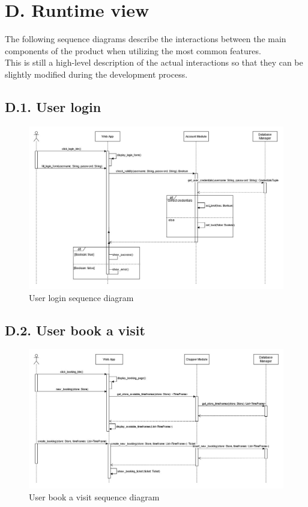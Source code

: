 \section{D. Runtime view}

The following sequence diagrams describe the interactions between the main components of the product when utilizing the most common features.\\
This is still a high-level description of the actual interactions so that they can be slightly modified during the development process.

\subsection{D.1. User login}

\begin{figure}[H]
\centering
\includegraphics{assets/dd/sequence_diagrams/user_login_sequence_diagram}
\caption{User login sequence diagram}
\end{figure}

\subsection{D.2. User book a visit}

\begin{figure}[H]
\centering
\includegraphics{assets/dd/sequence_diagrams/clupper_booking_sequence_diagram}
\caption{User book a visit sequence diagram}
\end{figure}

